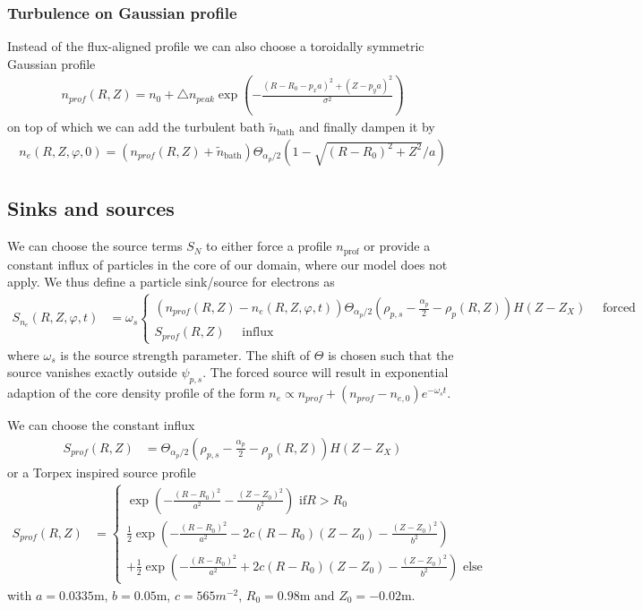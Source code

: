 \subsubsection{Turbulence on Gaussian profile}
Instead of the flux-aligned profile we can also choose a toroidally symmetric Gaussian profile
\begin{align} \label{eq:profile_blob}
  n_{prof}(R,Z) = n_0 + \triangle n_{peak} \exp\left( -\frac{(R - R_0 - p_x a)^2 + (Z-p_ya)^2}{\sigma^2} \right)
\end{align}
on top of which we can add the turbulent bath $\tilde n_{\text{bath}}$ and finally dampen it by
\begin{align}\label{eq:turbulence_on_gaussian}
    n_e(R,Z,\varphi,0) = (n_{prof}(R,Z) + \tilde n_{\text{bath}})\Theta_{\alpha_p/2}\left( 1- \sqrt{(R-R_0)^2 + Z^2}/a\right)
\end{align}

\subsection{Sinks and sources} \label{sec:sources}
We can choose the source terms $S_N$ to either force a profile
$n_{\text{prof}}$ or provide a constant influx of particles in the
core of our domain, where our model does not apply.
We thus define a particle sink/source for electrons as
\begin{align} \label{eq:electron_source}
  S_{n_e}(R,Z,\varphi, t) &= \omega_s \begin{cases}
      (n_{prof}(R,Z) - n_e(R,Z,\varphi, t))\Theta_{\alpha_p/2}\left( \rho_{p,s} - \frac{\alpha_p}{2} - \rho_p(R,Z) \right ) H(Z-Z_X) \quad \text{ forced}\\
    S_{prof}(R,Z)\quad \text{ influx}
    \end{cases}
\end{align}
where $\omega_s$ is the source strength parameter. The shift of $\Theta$ is chosen
such that the source vanishes exactly outside $\psi_{p,s}$.
The forced source will result in exponential adaption of the core
density profile of the form $n_e \propto n_{prof}+(n_{prof}-n_{e,0})e^{-\omega_st}$.

We can choose the constant influx
\begin{align} \label{eq:electron_source_influx}
    S_{prof}(R,Z) &= \Theta_{\alpha_p/2}\left( \rho_{p,s} - \frac{\alpha_p}{2} - \rho_p(R,Z) \right) H(Z-Z_X)
\end{align}
or a Torpex inspired source profile
\begin{align} \label{eq:electron_source_torpex}
  S_{prof}(R,Z) &=
  \begin{cases}
    \exp\left( - \frac{(R-R_0)^2}{a^2 }- \frac{(Z-Z_0)^2}{b^2}\right) \text{ if} R > R_0 \\
    \frac{1}{2}\exp\left( - \frac{(R-R_0)^2}{a^2} -2c(R-R_0)(Z-Z_0)- \frac{(Z-Z_0)^2}{b^2} \right) \\
  +\frac{1}{2}\exp\left( - \frac{(R-R_0)^2}{a^2} +2c(R-R_0)(Z-Z_0)- \frac{(Z-Z_0)^2}{b^2} \right) \text{ else}
              \end{cases}
\end{align}
with $a=0.0335$m, $b=0.05$m, $c=565m^{-2}$, $R_0=0.98$m and $Z_0=-0.02$m.


